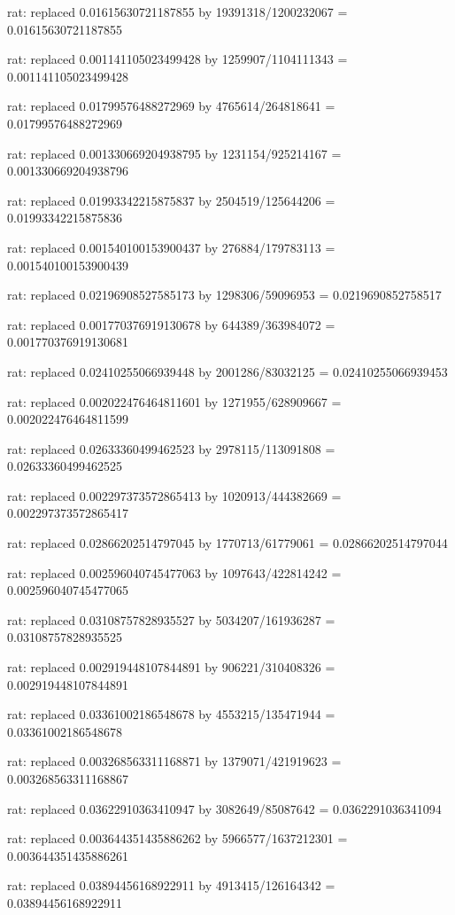 \documentclass[a4paper,10pt]{article}
\begin{document}
\begin{eulernotebook}
\begin{eulercomment}
\begin{eulercomment}
\begin{eulercomment}
\begin{eulercomment}
\begin{eulercomment}
\begin{eulercomment}
\begin{eulercomment}
\begin{eulercomment}
\begin{eulercomment}
\begin{eulercomment}
\begin{eulercomment}
\begin{eulercomment}
\begin{eulercomment}
\begin{eulercomment}
\begin{eulercomment}
\begin{eulercomment}
\begin{euleroutput}
  rat: replaced 0.01615630721187855 by 19391318/1200232067 = 0.01615630721187855
  
  rat: replaced 0.001141105023499428 by 1259907/1104111343 = 0.001141105023499428
  
  rat: replaced 0.01799576488272969 by 4765614/264818641 = 0.01799576488272969
  
  rat: replaced 0.001330669204938795 by 1231154/925214167 = 0.001330669204938796
  
  rat: replaced 0.01993342215875837 by 2504519/125644206 = 0.01993342215875836
  
  rat: replaced 0.001540100153900437 by 276884/179783113 = 0.001540100153900439
  
  rat: replaced 0.02196908527585173 by 1298306/59096953 = 0.0219690852758517
  
  rat: replaced 0.001770376919130678 by 644389/363984072 = 0.001770376919130681
  
  rat: replaced 0.02410255066939448 by 2001286/83032125 = 0.02410255066939453
  
  rat: replaced 0.002022476464811601 by 1271955/628909667 = 0.002022476464811599
  
  rat: replaced 0.02633360499462523 by 2978115/113091808 = 0.02633360499462525
  
  rat: replaced 0.002297373572865413 by 1020913/444382669 = 0.002297373572865417
  
  rat: replaced 0.02866202514797045 by 1770713/61779061 = 0.02866202514797044
  
  rat: replaced 0.002596040745477063 by 1097643/422814242 = 0.002596040745477065
  
  rat: replaced 0.03108757828935527 by 5034207/161936287 = 0.03108757828935525
  
  rat: replaced 0.002919448107844891 by 906221/310408326 = 0.002919448107844891
  
  rat: replaced 0.03361002186548678 by 4553215/135471944 = 0.03361002186548678
  
  rat: replaced 0.003268563311168871 by 1379071/421919623 = 0.003268563311168867
  
  rat: replaced 0.03622910363410947 by 3082649/85087642 = 0.0362291036341094
  
  rat: replaced 0.003644351435886262 by 5966577/1637212301 = 0.003644351435886261
  
  rat: replaced 0.03894456168922911 by 4913415/126164342 = 0.03894456168922911
  

\end{euleroutput}
\end{eulercomment}
\end{eulercomment}
\end{eulercomment}
\end{eulercomment}
\end{eulercomment}
\end{eulercomment}
\end{eulercomment}
\end{eulercomment}
\end{eulercomment}
\end{eulercomment}
\end{eulercomment}
\end{eulercomment}
\end{eulercomment}
\end{eulercomment}
\end{eulercomment}
\end{eulercomment}
\end{eulernotebook}
\end{document}
